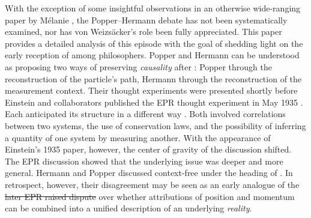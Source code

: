 \documentclass[pdflatex]{sn-jnl}
\newcommand{\TE}{thought experiment\xspace}
\newcommand{\vW}{von Weizsäcker\xspace}
\providecommand{\DIFadd}[1]{{\protect\color{blue}\uwave{#1}}} %
\providecommand{\DIFdel}[1]{{\protect\color{red}\sout{#1}}}                      %
\providecommand{\DIFaddbegin}{} %
\providecommand{\DIFaddend}{} %
\providecommand{\DIFdelbegin}{} %
\providecommand{\DIFdelend}{} %
\begin{document}
\DIFdelbegin %
\DIFdelend \DIFaddbegin 

\DIFaddend With the exception of some insightful observations in an otherwise wide-ranging paper by Mélanie \citet{Frappier2016}, the Popper--Hermann debate has not been systematically examined, nor has \vW's role been fully appreciated. This paper provides a detailed analysis of this episode with the goal of shedding light on the early reception of \qm among philosophers. Popper and Hermann can be understood as proposing two ways of preserving \emph{causality} after \qm: Popper through the reconstruction of the particle's path, Hermann through the reconstruction of the measurement context. Their thought experiments were presented shortly before Einstein and collaborators published the EPR \TE in May 1935 \citep{Einstein1935}. Each anticipated its structure in a different way \citep[176--181]{Jammer1974}. Both involved correlations between two systems, the use of conservation laws, and the possibility of inferring a quantity of one system by measuring another. With the appearance of Einstein's 1935 paper, however, the center of gravity of the discussion shifted. The EPR discussion showed that the underlying issue was deeper and more general. Hermann and Popper discussed context-free  under the heading of . In retrospect, however, their disagreement may be seen as an early analogue of the \DIFdelbegin \DIFdel{later EPR raised dispute }\DIFdelend \DIFaddbegin \DIFadd{dispute later raised by EPR }\DIFaddend over whether attributions of position and momentum can be combined into a unified description of an underlying \emph{reality}.
\DIFdelbegin %
\DIFdelend 

\DIFdelbegin %

\end{document}
